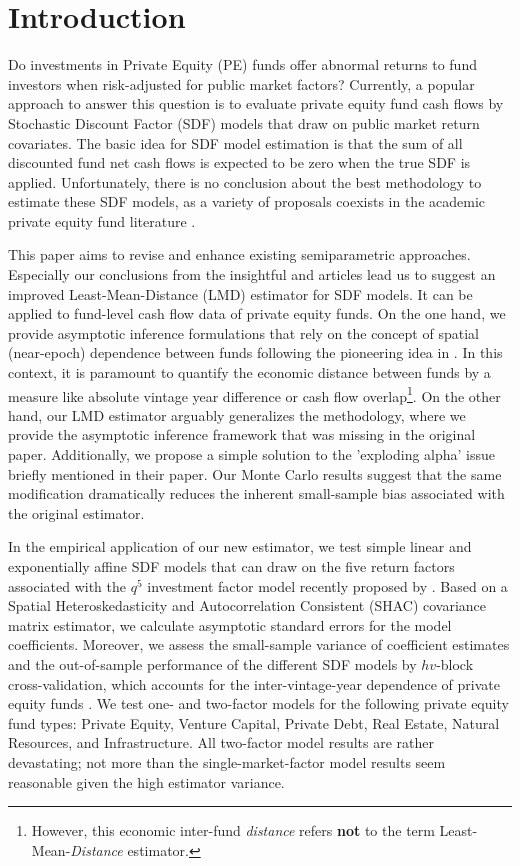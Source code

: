\documentclass[12pt]{article}
\begin{document}
\section{Introduction}

Do investments in Private Equity (PE) funds offer abnormal returns to fund investors when risk-adjusted for public market factors?
Currently, a popular approach to answer this question is to evaluate private equity fund cash flows by Stochastic Discount Factor (SDF) models that draw on public market return covariates.
The basic idea for SDF model estimation is that the sum of all discounted fund net cash flows is expected to be zero when the true SDF is applied.
Unfortunately, there is no conclusion about the best methodology to estimate these SDF models, as a variety of proposals coexists in the academic private equity fund literature \citep{DLP12,B14,KN16,ACGP18,GSW19}.

This paper aims to revise and enhance existing semiparametric approaches.
Especially our conclusions from the insightful \cite{DLP12} and \cite{KN16} articles lead us to suggest an improved Least-Mean-Distance (LMD) estimator for SDF models.
It can be applied to fund-level cash flow data of private equity funds.
On the one hand, we provide asymptotic inference formulations that rely on the concept of spatial (near-epoch) dependence between funds following the pioneering idea in \cite{KN16}.
In this context, it is paramount to quantify the economic distance between funds by a measure like absolute vintage year difference or cash flow overlap\footnote{However, this economic inter-fund \emph{distance} refers \textbf{not} to the term Least-Mean-\emph{Distance} estimator.}.
On the other hand, our LMD estimator arguably generalizes the \cite{DLP12} methodology, where we provide the asymptotic inference framework that was missing in the original paper.
Additionally, we propose a simple solution to the 'exploding alpha' issue briefly mentioned in their paper.
Our Monte Carlo results suggest that the same modification dramatically reduces the inherent small-sample bias associated with the original \cite{DLP12} estimator.

In the empirical application of our new estimator, we test simple linear and exponentially affine SDF models that can draw on the five return factors associated with the $q^5$ investment factor model recently proposed by \cite{HXZ20}.
Based on a Spatial Heteroskedasticity and Autocorrelation Consistent (SHAC) covariance matrix estimator, we calculate asymptotic standard errors for the model coefficients.
Moreover, we assess the small-sample variance of coefficient estimates and the out-of-sample performance of the different SDF models by $hv$-block cross-validation, which accounts for the inter-vintage-year dependence of private equity funds \citep{R00}.
We test one- and two-factor models for the following private equity fund types: Private Equity, Venture Capital, Private Debt, Real Estate, Natural Resources, and Infrastructure.
All two-factor model results are rather devastating; not more than the single-market-factor model results seem reasonable given the high estimator variance.
\end{document}
